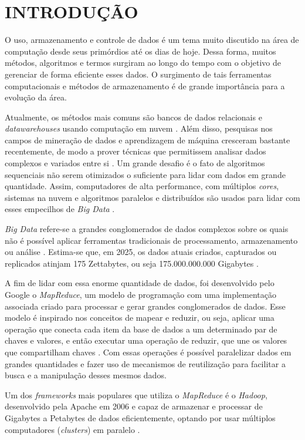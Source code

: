 \chapter{INTRODUÇÃO} \label{cha:introducao}

O uso, armazenamento e controle de dados é um tema muito discutido na área de computação desde seus primórdios até os dias de hoje. Dessa forma, muitos métodos, algoritmos e termos surgiram ao longo do tempo com o objetivo de gerenciar de forma eficiente esses dados. O surgimento de tais ferramentas computacionais e métodos de armazenamento é de grande importância para a evolução da área.

Atualmente, os métodos mais comuns são bancos de dados relacionais e \textit{\gls{datawarehouse}s} usando computação em nuvem \cite{PastAndFutureTrendsData19}. Além disso, pesquisas nos campos de mineração de dados e aprendizagem de máquina cresceram bastante recentemente, de modo a prover técnicas que permitissem analisar dados complexos e variados entre si \cite{ProgrammingBigData22}. Um grande desafio é o fato de algoritmos sequenciais não serem otimizados o suficiente para lidar com dados em grande quantidade. Assim, computadores de alta performance, com múltiplos \textit{\gls{cores}}, sistemas na nuvem e algoritmos paralelos e distribuídos são usados para lidar com esses empecilhos de \textit{Big Data} \cite{ProgrammingBigData22}.

\textit{Big Data} refere-se a grandes conglomerados de dados complexos sobre os quais não é possível aplicar ferramentas tradicionais de processamento, armazenamento ou análise \cite{OptmizationSoftwareHadoop18}. Estima-se que, em 2025, os dados atuais criados, capturados ou replicados atinjam 175 Zettabytes, ou seja 175.000.000.000 Gigabytes \cite{DigitalizationWorld18}.

A fim de lidar com essa enorme quantidade de dados, foi desenvolvido pelo Google o \textit{MapReduce}, um modelo de programação com uma implementação associada criado para processar e gerar grandes conglomerados de dados. Esse modelo é inspirado nos conceitos de mapear e reduzir, ou seja, aplicar uma operação que conecta cada item da base de dados a um determinado par de chaves e valores, e então executar uma operação de reduzir, que une os valores que compartilham chaves \cite{MapReduce08}. Com essas operações é possível paralelizar dados em grandes quantidades e fazer uso de mecanismos de reutilização para facilitar a busca e a manipulação desses mesmos dados.

Um dos \textit{\gls{framework}s} mais populares que utiliza o \textit{MapReduce} é o \textit{Hadoop}, desenvolvido pela Apache em 2006 e capaz de armazenar e processar de Gigabytes a Petabytes de dados eficientemente, optando por usar múltiplos computadores (\textit{clusters}) em paralelo \cite{HadoopBook15}.

